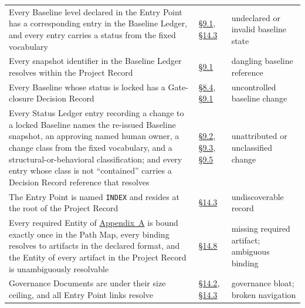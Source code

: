 \begin{longtable}{@{}p{} p{} p{}@{}}
Every Baseline level declared in the Entry Point has a corresponding entry in the Baseline Ledger, and every entry carries a status from the fixed vocabulary & \hyperlink{nss-9.1}{\S9.1}, \hyperlink{nss-14.3}{\S14.3} & undeclared or invalid baseline state \\
Every snapshot identifier in the Baseline Ledger resolves within the Project Record & \hyperlink{nss-9.1}{\S9.1} & dangling baseline reference \\
Every Baseline whose status is locked has a Gate-closure Decision Record & \hyperlink{nss-8.4}{\S8.4}, \hyperlink{nss-9.1}{\S9.1} & uncontrolled baseline change \\
Every Status Ledger entry recording a change to a locked Baseline names the re-issued Baseline snapshot, an approving named human owner, a change class from the fixed vocabulary, and a structural-or-behavioral classification; and every entry whose class is not ``contained'' carries a Decision Record reference that resolves & \hyperlink{nss-9.2}{\S9.2}, \hyperlink{nss-9.3}{\S9.3}, \hyperlink{nss-9.5}{\S9.5} & unattributed or unclassified change \\
The Entry Point is named \texttt{INDEX} and resides at the root of the Project Record & \hyperlink{nss-14.3}{\S14.3} & undiscoverable record \\
Every required Entity of \hyperlink{nss-appA}{Appendix~A} is bound exactly once in the Path Map, every binding resolves to artifacts in the declared format, and the Entity of every artifact in the Project Record is unambiguously resolvable & \hyperlink{nss-14.8}{\S14.8} & missing required artifact; ambiguous binding \\
Governance Documents are under their size ceiling, and all Entry Point links resolve & \hyperlink{nss-14.2}{\S14.2}, \hyperlink{nss-14.3}{\S14.3} & governance bloat; broken navigation \\
\bottomrule
\end{longtable}
\endgroup

